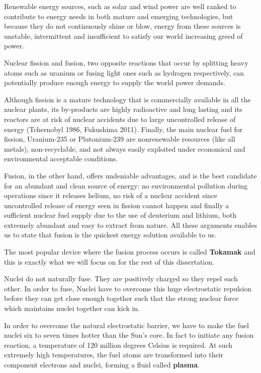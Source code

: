 \documentclass[12pt,lot, lof]{puthesis}
\begin{document}
Renewable energy sources, such as solar and wind power are well ranked to contribute to energy needs in both mature and emerging technologies, but because they do not continuously shine or blow, energy from these sources is unstable, intermittent and insufficient to satisfy our world increasing greed of power.

Nuclear fission and fusion, two opposite reactions that occur by splitting heavy atoms such as uranium or fusing light ones such as hydrogen respectively, can potentially produce enough energy to supply the world power demands. 

Although fission is a mature technology that is commercially available in all the nuclear plants, its by-products are highly radioactive and long lasting and its reactors are at risk of nuclear accidents due to large uncontrolled release of energy (Tchernobyl 1986, Fukushima 2011). Finally, the main nuclear fuel for fission, Uranium-235 or Plutonium-239 are nonrenewable resources (like all metals), non-recyclable, and not always easily exploited under economical and environmental acceptable conditions.

Fusion, in the other hand, offers undeniable advantages, and is the best candidate for an abundant and clean source of energy: no environmental pollution during operations since it releases helium, no risk of a nuclear accident since uncontrolled release of energy seen in fission cannot happen and finally a sufficient nuclear fuel supply due to the use of deuterium and lithium, both extremely abundant and easy to extract from nature. All these arguments enables us to state that fusion is the quickest energy solution available to us.

The most popular device where the fusion process occurs is called \textbf{Tokamak} and this is exactly what we will focus on for the rest of this dissertation.

Nuclei do not naturally fuse. They are positively charged so they repel each other. In order to fuse, Nuclei have to overcome this huge electrostatic repulsion before they can get close enough together such that the strong nuclear force which maintains nuclei together can kick in.

In order to overcome the natural electrostatic barrier, we have to make the fuel nuclei six to seven times hotter than the Sun's core. In fact to initiate any fusion reaction, a temperature of 120 million degrees Celsius is required. At such extremely high temperatures, the fuel atoms are transformed into their component electrons and nuclei, forming a fluid called \textbf{plasma}.
\end{document}
